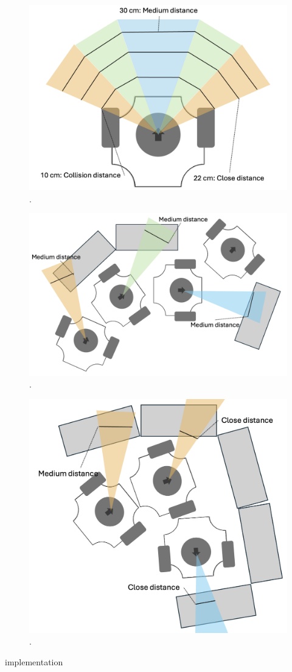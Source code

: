 \documentclass[conference]{IEEEtran}
\begin{document}
\begin{figure}[htbp]
    \centerline{\includegraphics[width=0.9\columnwidth]{LiDAR Distances.png}}
    \caption{.}
    \label{sec:distances}
    \end{figure}
\begin{figure}[htbp]
    \centerline{\includegraphics[width=0.9\columnwidth]{Medium Distance Aviodance.png}}
    \caption{.}
    \label{sec:medium aviodance}
    \end{figure}
\begin{figure}[htbp]
    \centerline{\includegraphics[width=0.9\columnwidth]{Close Distance Avoidance.png}}
    \caption{.}
    \label{sec:close aviodance}
    \end{figure}
implementation
\end{document}
